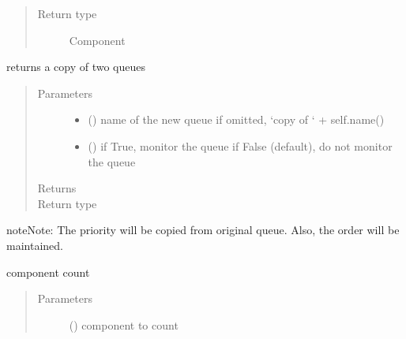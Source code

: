 \documentclass[letterpaper,10pt,english]{sphinxmanual}
\begin{document}
\begin{fulllineitems}
\begin{fulllineitems}
\begin{quote}
\begin{description}
\item[{Return type}] \leavevmode
Component 

\end{description}\end{quote}

\end{fulllineitems}


\begin{fulllineitems}
\label{\detokenize{Reference:salabim.Queue.copy}}
returns a copy of two queues
\begin{quote}\begin{description}
\item[{Parameters}] \leavevmode\begin{itemize}
\item {} 
 () \textendash{} name of the new queue 
if omitted, ‘copy of ‘ + self.name()

\item {} 
 () \textendash{} if True, monitor the queue 
if False (default), do not monitor the queue

\end{itemize}

\item[{Returns}] \leavevmode
{}

\item[{Return type}] \leavevmode
{\hyperref[\detokenize{Reference:salabim.Queue}]{}}

\end{description}\end{quote}

\begin{sphinxadmonition}{note}{Note:}
The priority will be copied from original queue.
Also, the order will be maintained.
\end{sphinxadmonition}

\end{fulllineitems}


\begin{fulllineitems}
\label{\detokenize{Reference:salabim.Queue.count}}
component count
\begin{quote}\begin{description}
\item[{Parameters}] \leavevmode
{} ({\hyperref[\detokenize{Reference:salabim.Component}]{}}) \textendash{} component to count


\end{description}
\end{quote}
\end{fulllineitems}
\end{fulllineitems}
\end{document}
